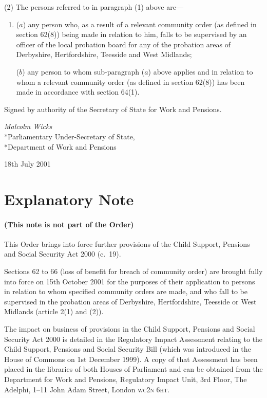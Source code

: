 \documentclass[12pt,a4paper]{article}
\begin{document}
(2) The persons referred to in paragraph (1) above are—
\begin{enumerate}\item[]
($a$) any person who, as a result of a relevant community order (as defined in section 62(8)) being made in relation to him, falls to be supervised by an officer of the local probation board for any of the probation areas of Derbyshire, Hertfordshire, Teesside and West Midlands;

($b$) any person to whom sub-paragraph ($a$)  above applies and in relation to whom a relevant community order (as defined in section 62(8)) has been made in accordance with section 64(1).
\end{enumerate}

\bigskip

Signed 
by authority of the Secretary of State for Work and Pensions.

{\raggedleft
\emph{Malcolm Wicks}\\*Parliamentary Under-Secretary of State,\\*Department of Work and Pensions

}

18th July 2001

\small

\part{Explanatory Note}

\renewcommand\parthead{— Explanatory Note}

\subsection*{(This note is not part of the Order)}

This Order brings into force further provisions of the Child Support, Pensions and Social Security Act 2000 (c.\ 19).

Sections 62 to 66 (loss of benefit for breach of community order) are brought fully into force on 15th October 2001 for the purposes of their application to persons in relation to whom specified community orders are made, and who fall to be supervised in the probation areas of Derbyshire, Hertfordshire, Teesside or West Midlands (article 2(1) and (2)).

The impact on business of provisions in the Child Support, Pensions and Social Security Act 2000 is detailed in the Regulatory Impact Assessment relating to the Child Support, Pensions and Social Security Bill (which was introduced in the House of Commons on 1st December 1999). A copy of that Assessment has been placed in the libraries of both Houses of Parliament and can be obtained from the Department for Work and Pensions, Regulatory Impact Unit, 3rd Floor, The Adelphi, 1--11 John Adam Street, London \textsc{\lowercase{WC2N 6HT}}. 
\end{document}

